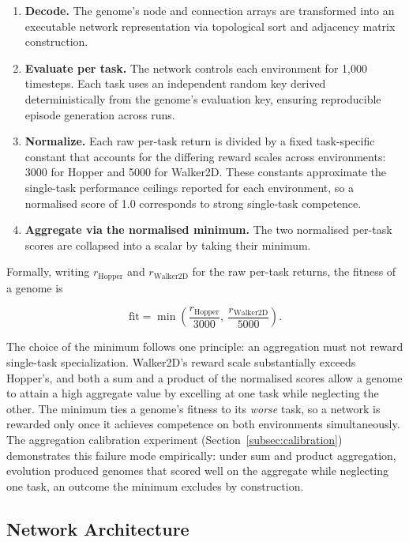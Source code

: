\documentclass[12pt]{article}
\begin{document}
\begin{enumerate}
    \item \textbf{Decode.} The genome's node and connection arrays are transformed into an executable network representation via topological sort and adjacency matrix construction.
    \item \textbf{Evaluate per task.} The network controls each environment for 1,000 timesteps. Each task uses an independent random key derived deterministically from the genome's evaluation key, ensuring reproducible episode generation across runs.
    \item \textbf{Normalize.} Each raw per-task return is divided by a fixed task-specific constant that accounts for the differing reward scales across environments: 3000 for Hopper and 5000 for Walker2D. These constants approximate the single-task performance ceilings reported for each environment, so a normalised score of 1.0 corresponds to strong single-task competence.
    \item \textbf{Aggregate via the normalised minimum.} The two normalised per-task scores are collapsed into a scalar by taking their minimum.
\end{enumerate}

Formally, writing $r_{\text{Hopper}}$ and $r_{\text{Walker2D}}$ for the raw per-task returns, the fitness of a genome is

\[\text{fit} = \min\!\left(\frac{r_{\text{Hopper}}}{3000},\ \frac{r_{\text{Walker2D}}}{5000}\right).\]

The choice of the minimum follows one principle: an aggregation must not reward single-task specialization.
Walker2D's reward scale substantially exceeds Hopper's, and both a sum and a product of the normalised scores allow a genome to attain a high aggregate value by excelling at one task while neglecting the other.
The minimum ties a genome's fitness to its \emph{worse} task, so a network is rewarded only once it achieves competence on both environments simultaneously.
The aggregation calibration experiment (Section~\ref{subsec:calibration}) demonstrates this failure mode empirically: under sum and product aggregation, evolution produced genomes that scored well on the aggregate while neglecting one task, an outcome the minimum excludes by construction.

\subsection{Network Architecture}
\label{subsec:network-architecture}
\end{document}
